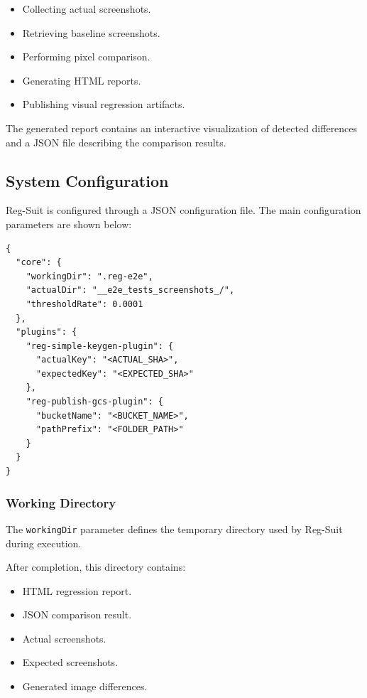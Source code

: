 \begin{itemize}
    \item Collecting actual screenshots.
    \item Retrieving baseline screenshots.
    \item Performing pixel comparison.
    \item Generating HTML reports.
    \item Publishing visual regression artifacts.
\end{itemize}

The generated report contains an interactive visualization of detected differences and a JSON file describing the comparison results.

\subsection{System Configuration}

Reg-Suit is configured through a JSON configuration file. The main configuration parameters are shown below:

\begin{lstlisting}[caption={Reg-Suit configuration}]
{
  "core": {
    "workingDir": ".reg-e2e",
    "actualDir": "__e2e_tests_screenshots_/",
    "thresholdRate": 0.0001
  },
  "plugins": {
    "reg-simple-keygen-plugin": {
      "actualKey": "<ACTUAL_SHA>",
      "expectedKey": "<EXPECTED_SHA>"
    },
    "reg-publish-gcs-plugin": {
      "bucketName": "<BUCKET_NAME>",
      "pathPrefix": "<FOLDER_PATH>"
    }
  }
}
\end{lstlisting}


\subsubsection{Working Directory}

The \texttt{workingDir} parameter defines the temporary directory used by Reg-Suit during execution.

After completion, this directory contains:

\begin{itemize}
    \item HTML regression report.
    \item JSON comparison result.
    \item Actual screenshots.
    \item Expected screenshots.
    \item Generated image differences.
\end{itemize}

